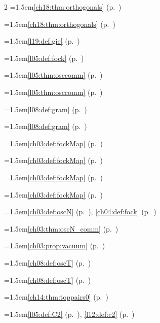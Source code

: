 \begin{multicols}{2}
\hangindent=1.5em\quad \ref{ch18:thm:orthogonals} (p.~\pageref{ch18:thm:orthogonals})\par
\hangindent=1.5em\quad \ref{ch18:thm:orthogonals} (p.~\pageref{ch18:thm:orthogonals})\par
\hangindent=1.5em\quad \ref{l19:def:gie} (p.~\pageref{l19:def:gie})\par
\hangindent=1.5em\quad \ref{l05:def:fock} (p.~\pageref{l05:def:fock})\par
\hangindent=1.5em\quad \ref{l05:thm:osccomm} (p.~\pageref{l05:thm:osccomm})\par
\hangindent=1.5em\quad \ref{l05:thm:osccomm} (p.~\pageref{l05:thm:osccomm})\par
\hangindent=1.5em\quad \ref{l08:def:gram} (p.~\pageref{l08:def:gram})\par
\hangindent=1.5em\quad \ref{l08:def:gram} (p.~\pageref{l08:def:gram})\par
\hangindent=1.5em\quad \ref{ch03:def:fockMap} (p.~\pageref{ch03:def:fockMap})\par
\hangindent=1.5em\quad \ref{ch03:def:fockMap} (p.~\pageref{ch03:def:fockMap})\par
\hangindent=1.5em\quad \ref{ch03:def:fockMap} (p.~\pageref{ch03:def:fockMap})\par
\hangindent=1.5em\quad \ref{ch03:def:fockMap} (p.~\pageref{ch03:def:fockMap})\par
\hangindent=1.5em\quad \ref{ch03:def:oscN} (p.~\pageref{ch03:def:oscN}), \ref{ch04:def:fock} (p.~\pageref{ch04:def:fock})\par
\hangindent=1.5em\quad \ref{ch03:thm:oscN_comm} (p.~\pageref{ch03:thm:oscN_comm})\par
\hangindent=1.5em\quad \ref{ch03:prop:vacuum} (p.~\pageref{ch03:prop:vacuum})\par
\hangindent=1.5em\quad \ref{ch08:def:oscT} (p.~\pageref{ch08:def:oscT})\par
\hangindent=1.5em\quad \ref{ch08:def:oscT} (p.~\pageref{ch08:def:oscT})\par
\hangindent=1.5em\quad \ref{ch14:thm:toppairs0} (p.~\pageref{ch14:thm:toppairs0})\par
\hangindent=1.5em\quad \ref{l05:def:C2} (p.~\pageref{l05:def:C2}), \ref{l12:def:c2} (p.~\pageref{l12:def:c2})\par

\end{multicols}

